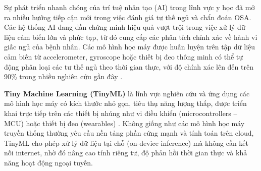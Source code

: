 Sự phát triển nhanh chóng của trí tuệ nhân tạo (AI) trong lĩnh vực y học 
đã mở ra nhiều hướng tiếp cận mới trong việc đánh giá tư thế ngủ và 
chẩn đoán OSA. Các hệ thống AI đang dần chứng minh hiệu quả vượt trội 
trong việc xử lý dữ liệu cảm biến lớn và phức tạp, từ đó cung cấp các 
phân tích chính xác về hành vi giấc ngủ của bệnh nhân. Các mô hình học 
máy được huấn luyện trên tập dữ liệu cảm biến từ accelerometer, gyroscope 
hoặc thiết bị đeo thông minh có thể tự động phân loại các tư thế ngủ 
theo thời gian thực, với độ chính xác lên đến trên 90\% trong nhiều 
nghiên cứu gần đây 
\cite{Sleep_Posture_Detection}\cite{Vu2025SleepPosition}\cite{HOANG2025116309}.

\textbf{Tiny Machine Learning (TinyML)} là lĩnh vực nghiên cứu và ứng dụng các 
mô hình học máy có kích thước nhỏ gọn, tiêu thụ năng lượng thấp, 
được triển khai trực tiếp trên các thiết bị nhúng như vi điều khiển 
(microcontrollers – MCU) hoặc thiết bị đeo (wearables) \cite{ray2021tinyml}. 
Không giống như các mô hình học máy truyền thống thường yêu cầu nền 
tảng phần cứng mạnh và tính toán trên cloud, TinyML cho phép xử lý dữ 
liệu tại chỗ (on-device inference) mà không cần kết nối internet, 
nhờ đó nâng cao tính riêng tư, độ phản hồi thời gian thực và khả năng 
hoạt động ngoại tuyến.

